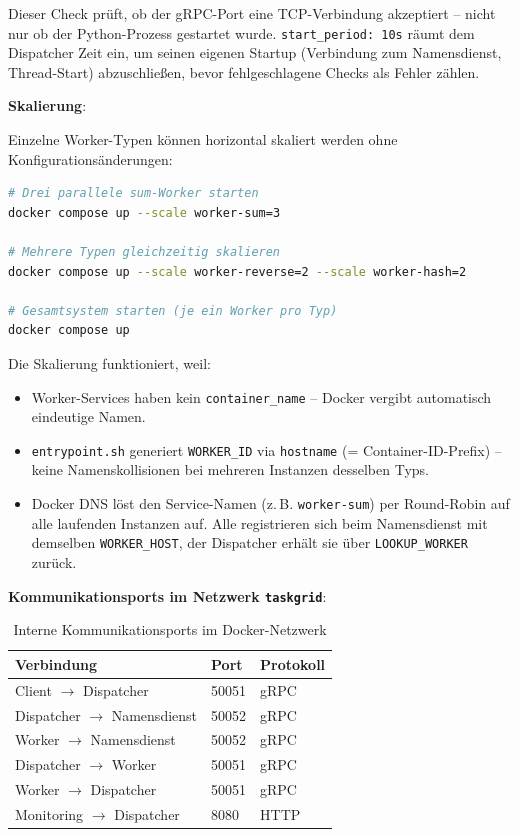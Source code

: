 Dieser Check prüft, ob der gRPC-Port eine TCP-Verbindung akzeptiert --
nicht nur ob der Python-Prozess gestartet wurde.
\texttt{start\_period: 10s} räumt dem Dispatcher Zeit ein, um seinen
eigenen Startup (Verbindung zum Namensdienst, Thread-Start) abzuschließen,
bevor fehlgeschlagene Checks als Fehler zählen.

\textbf{Skalierung}:

Einzelne Worker-Typen können horizontal skaliert werden ohne
Konfigurationsänderungen:

\begin{lstlisting}[language=bash,caption={Skalierungsbeispiele}]
# Drei parallele sum-Worker starten
docker compose up --scale worker-sum=3

# Mehrere Typen gleichzeitig skalieren
docker compose up --scale worker-reverse=2 --scale worker-hash=2

# Gesamtsystem starten (je ein Worker pro Typ)
docker compose up
\end{lstlisting}

Die Skalierung funktioniert, weil:
\begin{itemize}
  \item Worker-Services haben kein \texttt{container\_name} -- Docker vergibt
        automatisch eindeutige Namen.
  \item \texttt{entrypoint.sh} generiert \texttt{WORKER\_ID} via
        \texttt{hostname} (= Container-ID-Prefix) -- keine Namenskollisionen
        bei mehreren Instanzen desselben Typs.
  \item Docker DNS löst den Service-Namen (z.\,B. \texttt{worker-sum}) per
        Round-Robin auf alle laufenden Instanzen auf. Alle registrieren sich
        beim Namensdienst mit demselben \texttt{WORKER\_HOST}, der Dispatcher
        erhält sie über \texttt{LOOKUP\_WORKER} zurück.
\end{itemize}
\newpage
\textbf{Kommunikationsports im Netzwerk \texttt{taskgrid}}:

\begin{table}[H]
\centering
\begin{tabular}{lll}
\toprule
\textbf{Verbindung} & \textbf{Port} & \textbf{Protokoll} \\
\midrule
Client $\rightarrow$ Dispatcher & 50051 & gRPC \\
Dispatcher $\rightarrow$ Namensdienst & 50052 & gRPC \\
Worker $\rightarrow$ Namensdienst & 50052 & gRPC \\
Dispatcher $\rightarrow$ Worker & 50051 & gRPC \\
Worker $\rightarrow$ Dispatcher & 50051 & gRPC \\
Monitoring $\rightarrow$ Dispatcher & 8080 & HTTP \\
\bottomrule
\end{tabular}
\caption{Interne Kommunikationsports im Docker-Netzwerk}
\end{table}
